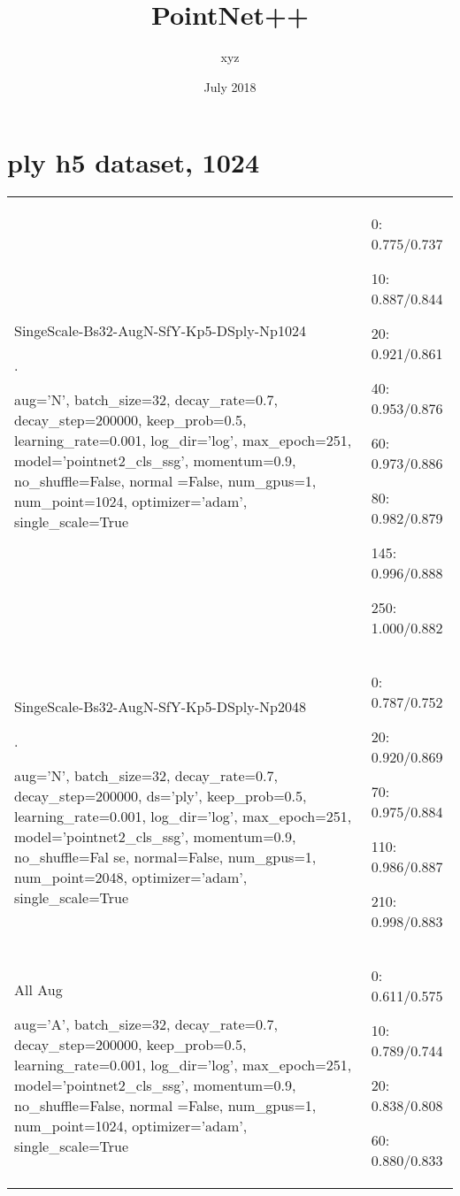 \documentclass[,table,dvipsnames]{article}
\title{PointNet++}
\author{xyz}
\date{July 2018}
\begin{document}
\noindent
\begin{titlepage}
	\maketitle
\end{titlepage}	

\section{ply h5 dataset, 1024}
\noindent\begin{tabular}{|p{10cm}|p{5.5cm}| }	
\hline
\rowcolor{green!20}
SingeScale-Bs32-AugN-SfY-Kp5-DSply-Np1024\par . \par
aug='N', batch\_size=32, decay\_rate=0.7, decay\_step=200000, keep\_prob=0.5, learning\_rate=0.001, log\_dir='log', max\_epoch=251, model='pointnet2\_cls\_ssg', momentum=0.9, no\_shuffle=False, normal    =False, num\_gpus=1, num\_point=1024, optimizer='adam', single\_scale=True& 
0: 0.775/0.737\par 10: 0.887/0.844\par 20: 0.921/0.861\par 40: 0.953/0.876\par  60: 0.973/0.886\par 80: 0.982/0.879\par 145: 0.996/0.888\par 250: 1.000/0.882\\	

\rowcolor{red!20}
SingeScale-Bs32-AugN-SfY-Kp5-DSply-Np2048 \par .\par 
aug='N', batch\_size=32, decay\_rate=0.7, decay\_step=200000, ds='ply', keep\_prob=0.5, learning\_rate=0.001, log\_dir='log', max\_epoch=251, model='pointnet2\_cls\_ssg', momentum=0.9, no\_shuffle=Fal    se, normal=False, num\_gpus=1, num\_point=2048, optimizer='adam', single\_scale=True &
0: 0.787/0.752\par 20: 0.920/0.869\par 70: 0.975/0.884\par 110: 0.986/0.887 \par 210: 0.998/0.883\\

\rowcolor{green!20}
All Aug\par 
aug='A', batch\_size=32, decay\_rate=0.7, decay\_step=200000, keep\_prob=0.5, learning\_rate=0.001, log\_dir='log', max\_epoch=251, model='pointnet2\_cls\_ssg', momentum=0.9, no\_shuffle=False, normal    =False, num\_gpus=1, num\_point=1024, optimizer='adam', single\_scale=True& 
0: 0.611/0.575\par  10: 0.789/0.744\par 20: 0.838/0.808\par 60: 0.880/0.833\\


\end{tabular}
\end{document}
